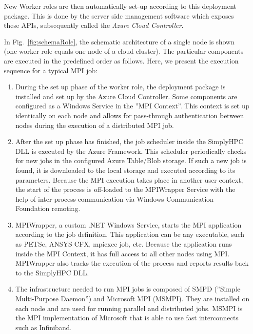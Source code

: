 \documentclass[3p,times]{elsarticle}
\begin{document}
New Worker roles are then automatically set-up according to this deployment package. This is done by the server side management software which exposes these APIs, subsequently called the \textit{Azure Cloud Controller}. 


In Fig.~\ref{fig:schemaRole}, the schematic architecture of a single node is shown (one worker role equals one node of a cloud cluster). The particular components are executed in the predefined order as follows. Here, we present the execution sequence for a typical MPI job:

\begin{enumerate}
	\item During the set up phase of the worker role, the deployment package is installed and set up by the Azure Cloud Controller. Some components are configured as a Windows Service in the ''MPI Context''. This context is set up identically on each node and allows for pass-through authentication between nodes during the execution of a distributed MPI job.

	\item After the set up phase has finished, the job scheduler inside the SimplyHPC DLL is executed by the Azure Framework. This scheduler periodically checks for new jobs in the configured Azure Table/Blob storage. If such a new job is found, it is downloaded to the local storage and executed according to its parameters. Because the MPI execution takes place in another user context, the start of the process is off-loaded to the MPIWrapper Service with the help of inter-process communication via Windows Communication Foundation remoting.

	\item MPIWrapper, a custom .NET Windows Service, starts the MPI application according to the job definition. This application can be any executable, such as PETSc, ANSYS CFX, mpiexec job, etc. Because the application runs inside the MPI Context, it has full access to all other nodes using MPI. MPIWrapper also tracks the execution of the process and reports results back to the SimplyHPC DLL.

	\item The infrastructure needed to run MPI jobs is composed of SMPD (''Simple Multi-Purpose Daemon'') and Microsoft MPI (MSMPI). They are installed on each node and are used for running parallel and distributed jobs. MSMPI is the MPI implementation of Microsoft that is able to use fast interconnects such as Infiniband.
\end{enumerate}
\end{document}
